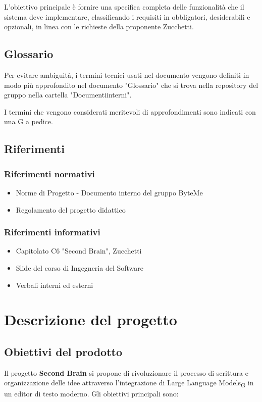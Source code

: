 \documentclass[11pt,a4paper]{article}
\begin{document}
L'obiettivo principale è fornire una specifica completa delle funzionalità che il sistema deve implementare, classificando i requisiti in obbligatori, desiderabili e opzionali, in linea con le richieste della proponente Zucchetti.

\subsection{Glossario}
Per evitare ambiguità, i termini tecnici usati nel documento vengono definiti in modo più approfondito nel documento "Glossario" che si trova nella repository del gruppo nella cartella "Documenti\textunderscore interni".

I termini che vengono considerati meritevoli di approfondimenti sono indicati con una G a pedice.

\subsection{Riferimenti}
\subsubsection{Riferimenti normativi}
\begin{itemize}
    \item Norme di Progetto - Documento interno del gruppo ByteMe
    \item Regolamento del progetto didattico
\end{itemize}

\subsubsection{Riferimenti informativi}
\begin{itemize}
    \item Capitolato C6 "Second Brain", Zucchetti
    \item Slide del corso di Ingegneria del Software
    \item Verbali interni ed esterni
\end{itemize}

\newpage

\section{Descrizione del progetto}
\subsection{Obiettivi del prodotto}
Il progetto \textbf{Second Brain} si propone di rivoluzionare il processo di scrittura e organizzazione delle idee attraverso l'integrazione di Large Language Models\textsubscript{G} in un editor di testo moderno. Gli obiettivi principali sono:
\end{document}

